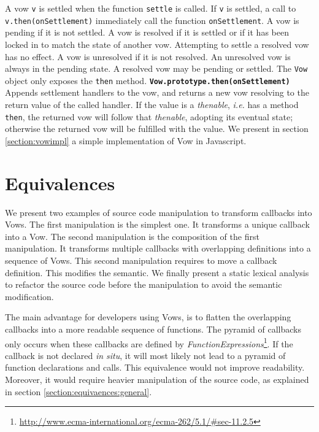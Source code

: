 A vow \texttt{v} is settled when the function \texttt{settle} is called.
If \texttt{v} is settled, a call to \texttt{v.then(onSettlement)} immediately call the function \texttt{onSettlement}.
A vow is pending if it is not settled.
A vow is resolved if it is settled or if it has been locked in to match the state of another vow.
Attempting to settle a resolved vow has no effect.
A vow is unresolved if it is not resolved.
An unresolved vow is always in the pending state.
A resolved vow may be pending or settled.
The \texttt{Vow} object only exposes the \texttt{then} method.
\textbf{\texttt{Vow.prototype.then(onSettlement)}}\\
Appends settlement handlers to the vow, and returns a new vow resolving to the return value of the called handler.
If the value is a \textit{thenable}, \textit{i.e.} has a method \texttt{then}, the returned vow will follow that \textit{thenable}, adopting its eventual state; otherwise the returned vow will be fulfilled with the value.
We present in section \ref{section:vowimpl} a simple implementation of Vow in Javascript.

\section{Equivalences} \label{section:equivalences}

We present two examples of source code manipulation to transform callbacks into Vows.
The first manipulation is the simplest one.
It transforms a unique callback into a Vow.
The second manipulation is the composition of the first manipulation.
It transforms multiple callbacks with overlapping definitions into a sequence of Vows.
This second manipulation requires to move a callback definition.
This modifies the semantic.
We finally present a static lexical analysis to refactor the source code before the manipulation to avoid the semantic modification.

The main advantage for developers using Vows, is to flatten the overlapping callbacks into a more readable sequence of functions.
The pyramid of callbacks only occurs when these callbacks are defined by \textit{FunctionExpressions}\footnote{\url{http://www.ecma-international.org/ecma-262/5.1/\#sec-11.2.5}}.
If the callback is not declared \textit{in situ}, it will most likely not lead to a pyramid of function declarations and calls.
This equivalence would not improve readability.
Moreover, it would require heavier manipulation of the source code, as explained in section \ref{section:equivaences:general}.

